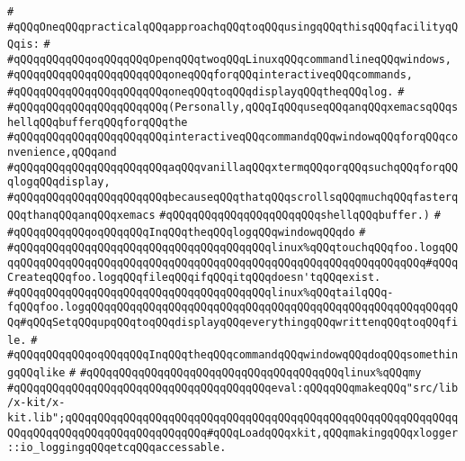 \verb|#|\newline
\verb|#qQQqOneqQQqpracticalqQQqapproachqQQqtoqQQqusingqQQqthisqQQqfacilityqQQqis:|\newline
\verb|#|\newline
\verb|#qQQqqQQqqQQqoqQQqqQQqOpenqQQqtwoqQQqLinuxqQQqcommandlineqQQqwindows,|\newline
\verb|#qQQqqQQqqQQqqQQqqQQqqQQqoneqQQqforqQQqinteractiveqQQqcommands,|\newline
\verb|#qQQqqQQqqQQqqQQqqQQqqQQqoneqQQqtoqQQqdisplayqQQqtheqQQqlog.|\newline
\verb|#|\newline
\verb|#qQQqqQQqqQQqqQQqqQQqqQQq(Personally,qQQqIqQQquseqQQqanqQQqxemacsqQQqshellqQQqbufferqQQqforqQQqthe|\newline
\verb|#qQQqqQQqqQQqqQQqqQQqqQQqinteractiveqQQqcommandqQQqwindowqQQqforqQQqconvenience,qQQqand|\newline
\verb|#qQQqqQQqqQQqqQQqqQQqqQQqaqQQqvanillaqQQqxtermqQQqorqQQqsuchqQQqforqQQqlogqQQqdisplay,|\newline
\verb|#qQQqqQQqqQQqqQQqqQQqqQQqbecauseqQQqthatqQQqscrollsqQQqmuchqQQqfasterqQQqthanqQQqanqQQqxemacs|\newline
\verb|#qQQqqQQqqQQqqQQqqQQqqQQqshellqQQqbuffer.)|\newline
\verb|#|\newline
\verb|#qQQqqQQqqQQqoqQQqqQQqInqQQqtheqQQqlogqQQqwindowqQQqdo|\newline
\verb|#|\newline
\verb|#qQQqqQQqqQQqqQQqqQQqqQQqqQQqqQQqqQQqqQQqlinux%qQQqtouchqQQqfoo.logqQQqqQQqqQQqqQQqqQQqqQQqqQQqqQQqqQQqqQQqqQQqqQQqqQQqqQQqqQQqqQQqqQQq#qQQqCreateqQQqfoo.logqQQqfileqQQqifqQQqitqQQqdoesn'tqQQqexist.|\newline
\verb|#qQQqqQQqqQQqqQQqqQQqqQQqqQQqqQQqqQQqqQQqlinux%qQQqtailqQQq-fqQQqfoo.logqQQqqQQqqQQqqQQqqQQqqQQqqQQqqQQqqQQqqQQqqQQqqQQqqQQqqQQqqQQq#qQQqSetqQQqupqQQqtoqQQqdisplayqQQqeverythingqQQqwrittenqQQqtoqQQqfile.|\newline
\verb|#|\newline
\verb|#qQQqqQQqqQQqoqQQqqQQqInqQQqtheqQQqcommandqQQqwindowqQQqdoqQQqsomethingqQQqlike|\newline
\verb|#|\newline
\verb|#qQQqqQQqqQQqqQQqqQQqqQQqqQQqqQQqqQQqqQQqlinux%qQQqmy|\newline
\verb|#qQQqqQQqqQQqqQQqqQQqqQQqqQQqqQQqqQQqqQQqeval:qQQqqQQqmakeqQQq"src/lib/x-kit/x-kit.lib";qQQqqQQqqQQqqQQqqQQqqQQqqQQqqQQqqQQqqQQqqQQqqQQqqQQqqQQqqQQqqQQqqQQqqQQqqQQqqQQqqQQqqQQqqQQq#qQQqLoadqQQqxkit,qQQqmakingqQQqxlogger::io_loggingqQQqetcqQQqaccessable.|\newline
